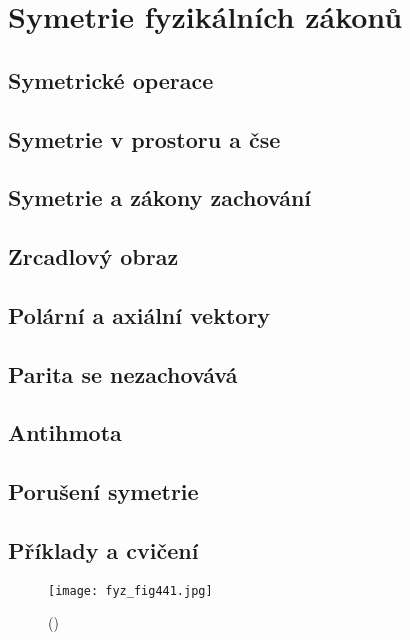 {
\chapter{Symetrie fyzikálních zákonů}\label{fyz:IchapLII}
\minitoc
  \section{Symetrické operace}\label{fyz:IchapLIIsecI}
  \section{Symetrie v prostoru a čse}\label{fyz:IchapLIIsecII}
  \section{Symetrie a zákony zachování}\label{fyz:IchapLIIsecIII}
  \section{Zrcadlový obraz}\label{fyz:IchapLIIsecIV}
  \section{Polární a axiální vektory}\label{fyz:IchapLIIsecV}
  \section{Parita se nezachovává}\label{fyz:IchapLIIsecVI}
  \section{Antihmota}\label{fyz:IchapLIIsecVII}
  \section{Porušení symetrie}\label{fyz:IchapLIIsecVIII}
  \section{Příklady a cvičení}\label{fyz:IchapLIIsecIX}
  
    \begin{figure}[ht!] %
      \centering
      \texttt{[image: fyz\_fig441.jpg]}
      \caption{
               (\cite[s.~704]{Feynman01})}
      \label{fyz_fig441}
    \end{figure}

}
